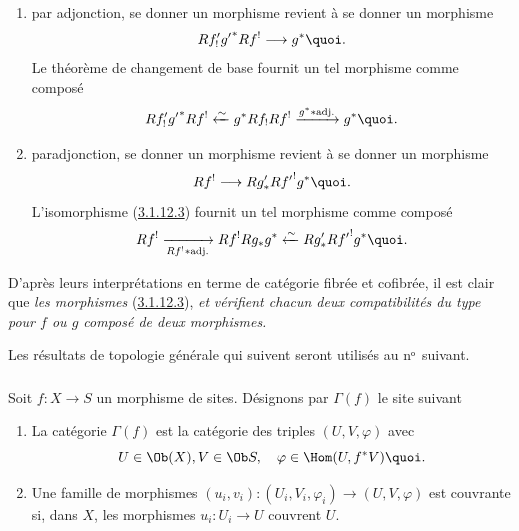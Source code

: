 \begin{enumerate}
\renewcommand{\theenumi}{\alph{enumi}}
\renewcommand{\labelenumi}{\theenumi)}
\item par adjonction, se donner un morphisme  revient à se
donner un morphisme
$$
Rf'_{!}{g'}^{\ast}Rf^{!}\longrightarrow g^{\ast}{\quoi}.
$$
Le théorème de changement de base fournit un tel morphisme comme
composé
$$
Rf'_{!}{g'}^{\ast}Rf^{!}\xleftarrow{\sim}
g^{\ast}Rf_{!}Rf^{!}\xrightarrow{g^{\ast}\ast \text{adj.}} g^{\ast}{\quoi}.
$$

\item par\pageoriginale adjonction, se donner un morphisme 
revient à se donner un morphisme
$$
Rf^{!}\longrightarrow Rg'_{\ast}R{f'}^{!}g^{\ast}{\quoi}.
$$
L'isomorphisme (\hyperref[XVIII.cor3.1.12.3]{3.1.12.3}) fournit un tel morphisme comme composé
$$
Rf^{!}\xrightarrow[Rf^{!}\ast \text{adj.}]{} Rf^{!}Rg_{\ast}
g^{\ast}\xleftarrow{\sim} Rg'_{\ast}R{f'}^{!}g^{\ast}{\quoi}.
$$
\end{enumerate}

D'après leurs interprétations en terme de catégorie fibrée et
cofibrée, il est clair que \emph{les morphismes} (\hyperref[XVIII.cor3.1.12.3]{3.1.12.3}),
 \emph{et}  \emph{vérifient chacun deux
compatibilités du type}  \emph{pour $f$ ou $g$ composé de deux
morphismes.}

Les résultats de topologie générale qui suivent seront utilisés au
nᵒ suivant.

\subsubsection{}
Soit $f:X\rightarrow S$ un morphisme de sites. Désignons par
$\Gamma(f)$ le site suivant
\begin{enumerate}
\renewcommand{\theenumi}{\alph{enumi}}
\renewcommand{\labelenumi}{\theenumi)}
\item La catégorie $\Gamma(f)$ est la catégorie des triples
$(U,V,\varphi)$ avec
$$
U\in \Ob (X), V\in \Ob S,\quad \varphi\in \Hom
(U,f^{\ast}V){\quoi}.
$$

\item Une famille de morphismes
$(u_{i},v_{i}):(U_{i},V_{i},\varphi_{i})\rightarrow (U,V,\varphi)$ est
couvrante si, dans $X$, les morphismes $u_{i}:U_{i}\rightarrow U$
couvrent $U$.
\end{enumerate}

